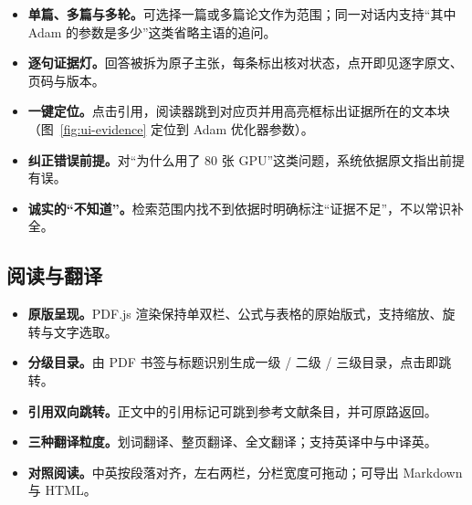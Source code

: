 \noindent
\begin{minipage}[t]{0.52\linewidth}\vspace{0pt}
  \label{fig:ui-evidence}
\end{minipage}\hfill
\begin{minipage}[t]{0.455\linewidth}\vspace{0pt}
\begin{itemize}[leftmargin=1.2em,itemsep=0pt,topsep=0pt]\small
  \item \textbf{单篇、多篇与多轮。}可选择一篇或多篇论文作为范围；同一对话内支持“其中 Adam 的参数是多少”这类省略主语的追问。
  \item \textbf{逐句证据灯。}回答被拆为原子主张，每条标出核对状态，点开即见逐字原文、页码与版本。
  \item \textbf{一键定位。}点击引用，阅读器跳到对应页并用高亮框标出证据所在的文本块（图~\ref{fig:ui-evidence} 定位到 Adam 优化器参数）。
  \item \textbf{纠正错误前提。}对“为什么用了 80 张 GPU”这类问题，系统依据原文指出前提有误。
  \item \textbf{诚实的“不知道”。}检索范围内找不到依据时明确标注“证据不足”，不以常识补全。
\end{itemize}
\end{minipage}

\subsection{阅读与翻译}

\noindent
\begin{minipage}[t]{0.52\linewidth}\vspace{0pt}
  \label{fig:ui-reader}
\end{minipage}\hfill
\begin{minipage}[t]{0.455\linewidth}\vspace{0pt}
\begin{itemize}[leftmargin=1.2em,itemsep=0pt,topsep=0pt]\small
  \item \textbf{原版呈现。}PDF.js 渲染保持单双栏、公式与表格的原始版式，支持缩放、旋转与文字选取。
  \item \textbf{分级目录。}由 PDF 书签与标题识别生成一级 / 二级 / 三级目录，点击即跳转。
  \item \textbf{引用双向跳转。}正文中的引用标记可跳到参考文献条目，并可原路返回。
  \item \textbf{三种翻译粒度。}划词翻译、整页翻译、全文翻译；支持英译中与中译英。
  \item \textbf{对照阅读。}中英按段落对齐，左右两栏，分栏宽度可拖动；可导出 Markdown 与 HTML。
\end{itemize}
\end{minipage}

